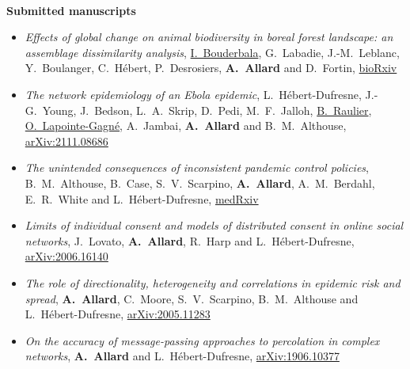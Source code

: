 \documentclass[11pt]{article}
\newlength{\BoxWidth}
\newcommand{\TitreA}[1]{\colorbox{background}{\makebox[\BoxWidth][c]{\Large\textrm{\textsc{#1}}}}\vspace{0.75\baselineskip}\\}
\newcommand{\SousTitreA}[2]{{\normalsize\textbf{#1} #2 \vspace{-0.5\baselineskip}}}
\begin{document}
%
%
%
%
%
\TitreA{Publications and Presentations}
%
%
\SousTitreA{Submitted manuscripts\footnotemark}{}
%
%
\begin{itemize}
%
  \item \textit{Effects of global change on animal biodiversity in boreal forest landscape: an assemblage dissimilarity analysis}, \uline{I.~Bouderbala}, G.~Labadie, J.-M.~Leblanc, Y.~Boulanger, C.~Hébert, P.~Desrosiers, \textbf{A.~Allard} and D.~Fortin, \href{https://doi.org/10.1101/2022.01.31.477297}{bioRxiv}
%
  \item \textit{The network epidemiology of an Ebola epidemic}, L.~Hébert-Dufresne, J.-G.~Young, J.~Bedson, L.~A.~Skrip, D.~Pedi, M.~F.~Jalloh, \uline{B.~Raulier}, \uline{O.~Lapointe-Gagné}, A.~Jambai, \textbf{A.~Allard} and B.~M.~Althouse, \href{https://arxiv.org/abs/2111.08686}{arXiv:2111.08686}
%
  \item \textit{The unintended consequences of inconsistent pandemic control policies}, B.~M.~Althouse, B.~Case, S.~V.~Scarpino, \textbf{A.~Allard}, A.~M.~Berdahl, E.~R.~White and L.~Hébert-Dufresne, \href{https://doi.org/10.1101/2020.08.21.20179473}{medRxiv}
%
  \item \textit{Limits of individual consent and models of distributed consent in online social networks}, J.~Lovato, \textbf{A.~Allard}, R.~Harp and L.~H\'ebert-Dufresne, \href{https://arxiv.org/abs/2006.16140}{arXiv:2006.16140}
%
  \item \textit{The role of directionality, heterogeneity and correlations in epidemic risk and spread}, \textbf{A.~Allard}, C.~Moore, S.~V.~Scarpino, B.~M.~Althouse and L.~H\'ebert-Dufresne, \href{https://arxiv.org/abs/2005.11283}{arXiv:2005.11283}
%
  \item \textit{On the accuracy of message-passing approaches to percolation in complex networks}, \textbf{A.~Allard} and L.~H\'ebert-Dufresne, \href{https://arxiv.org/abs/1906.10377}{arXiv:1906.10377}
%
%
\end{itemize}
\end{document}
